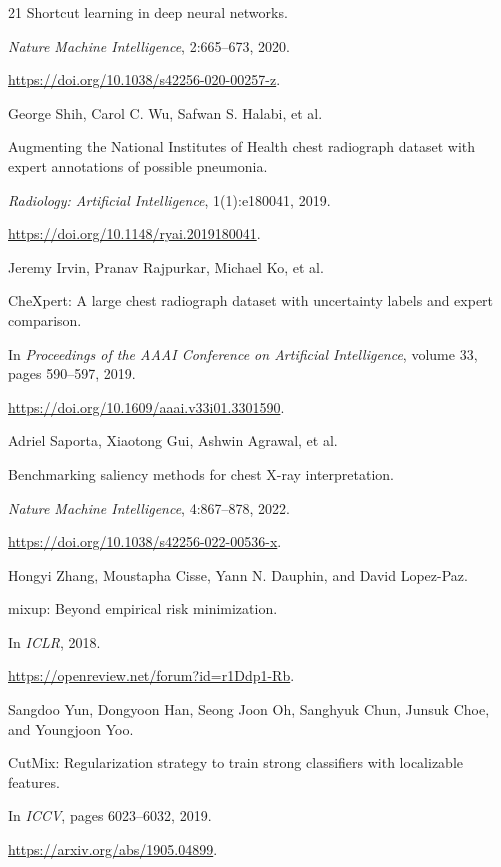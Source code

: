 \begin{thebibliography}{21}
Shortcut learning in deep neural networks.

\emph{Nature Machine Intelligence}, 2:665--673, 2020.

\url{https://doi.org/10.1038/s42256-020-00257-z}.


George Shih, Carol C. Wu, Safwan S. Halabi, et al.

Augmenting the National Institutes of Health chest radiograph dataset with expert annotations of possible pneumonia.

\emph{Radiology: Artificial Intelligence}, 1(1):e180041, 2019.

\url{https://doi.org/10.1148/ryai.2019180041}.


Jeremy Irvin, Pranav Rajpurkar, Michael Ko, et al.

CheXpert: A large chest radiograph dataset with uncertainty labels and expert comparison.

In \emph{Proceedings of the AAAI Conference on Artificial Intelligence}, volume 33, pages 590--597, 2019.

\url{https://doi.org/10.1609/aaai.v33i01.3301590}.


Adriel Saporta, Xiaotong Gui, Ashwin Agrawal, et al.

Benchmarking saliency methods for chest X-ray interpretation.

\emph{Nature Machine Intelligence}, 4:867--878, 2022.

\url{https://doi.org/10.1038/s42256-022-00536-x}.


Hongyi Zhang, Moustapha Cisse, Yann N. Dauphin, and David Lopez-Paz.

mixup: Beyond empirical risk minimization.

In \emph{ICLR}, 2018.

\url{https://openreview.net/forum?id=r1Ddp1-Rb}.


Sangdoo Yun, Dongyoon Han, Seong Joon Oh, Sanghyuk Chun, Junsuk Choe, and Youngjoon Yoo.

CutMix: Regularization strategy to train strong classifiers with localizable features.

In \emph{ICCV}, pages 6023--6032, 2019.

\url{https://arxiv.org/abs/1905.04899}.


\end{thebibliography}

